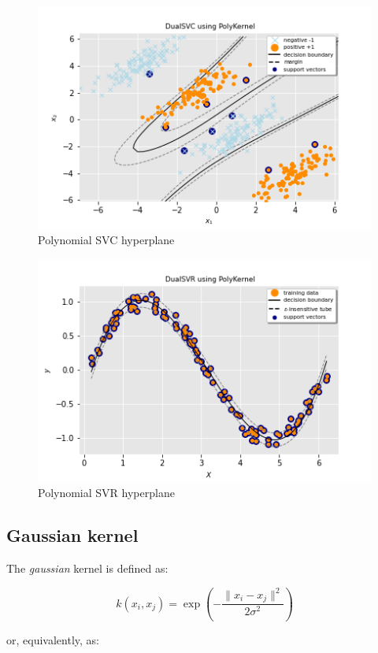 \begin{figure}[h!]
	\includegraphics[scale=0.5]{img/poly_dual_svc_hyperplane.png}
  	\caption{Polynomial SVC hyperplane}
  	\label{fig:poly_dual_svc_hyperplane}
\end{figure}

\begin{figure}[h!]
	\includegraphics[scale=0.5]{img/poly_dual_svr_hyperplane.png}
	\caption{Polynomial SVR hyperplane}
	\label{fig:poly_dual_svr_hyperplane}
\end{figure}

\subsection{Gaussian kernel}

The \emph{gaussian} kernel is defined as:

\begin{equation} \label{eq:gaussian_kernel1}
	k(x_i,x_j)=\exp(-\frac{\|x_i-x_j\|^2}{2\sigma^2})
\end{equation}

or, equivalently, as:

